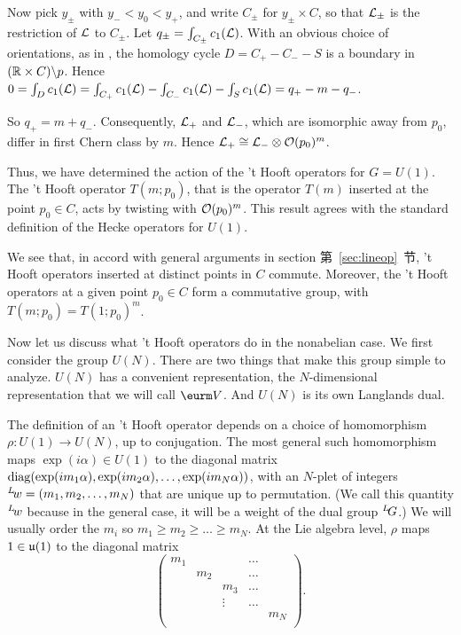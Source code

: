  Now pick $y_\pm$ with
$y_-<y_0<y_+$, and write $C_\pm$ for $ y_\pm\times C$, so that
${\cal L}_\pm $ is the restriction of ${\cal L}$ to $C_\pm$. Let
$q_\pm=\int_{C_\pm}c_1({\cal L})$. With an obvious choice of
orientations, as in  \notampo, the homology cycle $D=C_+-C_--S$ is
a boundary in $(\Bbb{R}\times C)\backslash p$. Hence
$0=\int_Dc_1({\cal L})=\int_{C_+}c_1({\cal L})-\int_{C_-}c_1({\cal
L})-\int_Sc_1({\cal L})=q_+-m-q_-$.

So $q_+=m+q_-$.  Consequently, ${\cal L}_+$ and ${\cal L}_-$,
which are isomorphic away from $p_0$, differ in first Chern class
by $m$. Hence ${\cal L}_+\cong {\cal L}_-\otimes {\cal O}(p_0)^m$.

Thus, we have determined the action of the 't Hooft operators for
$G=U(1)$.  The 't Hooft operator $T(m;p_0)$, that is the operator
$T(m)$ inserted at the point $p_0\in C$, acts by twisting with
${\cal O}(p_0)^m$.   This result agrees with the standard
definition of the Hecke operators for $U(1)$.

We see that, in accord with general arguments in section 第~\ref{sec:lineop}~节,
 't Hooft operators inserted at distinct points in $C$
 commute.  Moreover, the 't Hooft operators at
a given point $p_0\in C$ form a commutative group, with
$T(m;p_0)=T(1;p_0)^m$.

\par{}

\def\VV{\eurm V}

Now let us discuss what 't Hooft operators do in the nonabelian
case.  We first consider the group $U(N)$.  There are two things
that make this group simple to analyze.  $U(N)$ has a convenient
representation, the $N$-dimensional representation that we will
call $\VV$. And $U(N)$ is its own Langlands dual.

The definition of an 't Hooft operator depends on a choice of
homomorphism $\rho:U(1)\to U(N)$, up to conjugation.  The most
general such homomorphism maps $\exp({i\alpha})\in U(1)$ to the
diagonal matrix ${\rm
diag}(\exp({im_1\alpha}),\exp({im_2\alpha}),\dots,
\exp({im_N\alpha}))$, with an $N$-plet of integers
$^L\negthinspace w=(m_1,m_2,\dots,m_N)$ that are unique up to
permutation. (We call this quantity $^L\negthinspace w$ because in
the general case, it will be a weight of the dual group
$^L\negthinspace G$.) We will usually order the $m_i$ so $m_1\geq
m_2\geq \dots\geq m_N$. At the Lie algebra level, $\rho$ maps
$1\in \frak{u}(1)$ to the diagonal matrix
\setcounter{equation}{10}
\begin{equation}\label{eq:morphy}
\left(\begin{matrix}m_1& & & \dots & \\
                                    &m_2& & \dots & \\
                          & & m_3 &\dots & \\
                & & \vdots & \dots& \\
            & & & & m_N\\\end{matrix}\right).
\end{equation}

